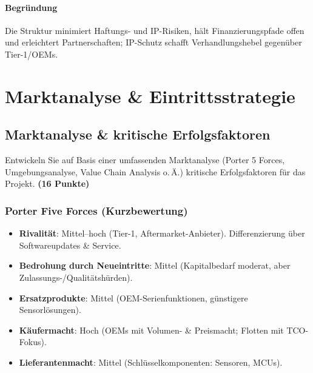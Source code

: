 \documentclass[
%
ngerman %
%
numeric %
]{wbh-assignment}
\begin{document}
\paragraph{Begründung}
Die Struktur minimiert Haftungs- und IP-Risiken, hält Finanzierungspfade offen und erleichtert Partnerschaften; IP-Schutz schafft Verhandlungshebel gegenüber Tier-1/OEMs.

\section{Marktanalyse \& Eintrittsstrategie}
\label{sec:marktanalyse}

\subsection{Marktanalyse \& kritische Erfolgsfaktoren}
\begin{aufgabenstellung}
Entwickeln Sie auf Basis einer umfassenden Marktanalyse (Porter 5 Forces, Umgebungsanalyse, Value Chain Analysis o.\,Ä.) kritische Erfolgsfaktoren für das Projekt. \textbf{(16 Punkte)}
\end{aufgabenstellung}

\vspace*{5mm}

\subsubsection{Porter Five Forces (Kurzbewertung)}
\begin{itemize}
  \item \textbf{Rivalität}: Mittel–hoch (Tier-1, Aftermarket-Anbieter). Differenzierung über Softwareupdates \& Service.
  \item \textbf{Bedrohung durch Neueintritte}: Mittel (Kapitalbedarf moderat, aber Zulassungs-/Qualitätshürden).
  \item \textbf{Ersatzprodukte}: Mittel (OEM-Serienfunktionen, günstigere Sensorlösungen).
  \item \textbf{Käufermacht}: Hoch (OEMs mit Volumen- \& Preismacht; Flotten mit TCO-Fokus).
  \item \textbf{Lieferantenmacht}: Mittel (Schlüsselkomponenten: Sensoren, MCUs).
\end{itemize}
\end{document}
